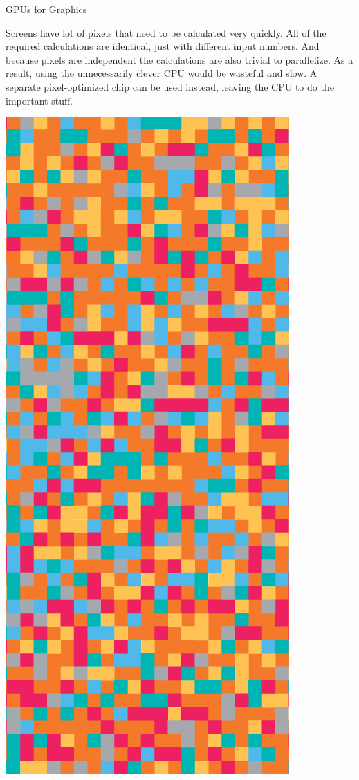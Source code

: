 \documentclass{lug}
\newcommand{\pmidg}[1]{\parbox{\widthof{#1}}{#1}}
\newcommand{\splitslide}[4]{
    \noindent
    \begin{minipage}{#1 \textwidth - #2 }
        #3
    \end{minipage}%
    \hspace{ \dimexpr #2 * 2 \relax }%
    \begin{minipage}{\textwidth - #1 \textwidth - #2 }
        #4
    \end{minipage}
}
\begin{document}
\begin{frame}{GPUs for Graphics}
    \splitslide{0.75}{.7em}{

        Screens have lot of pixels that need to be calculated very quickly.
        All of the required calculations are identical, just with different
        input numbers. And because pixels are independent the calculations are
        also trivial to parallelize. As a result, using the unnecessarily
        clever CPU would be wasteful and slow. A separate  pixel-optimized
        chip can be used instead, leaving the CPU to do the important stuff.

    }{
        \pmidg{\includegraphics[width=\textwidth]{graphics/pixels}}
    }
\end{frame}
\end{document}
